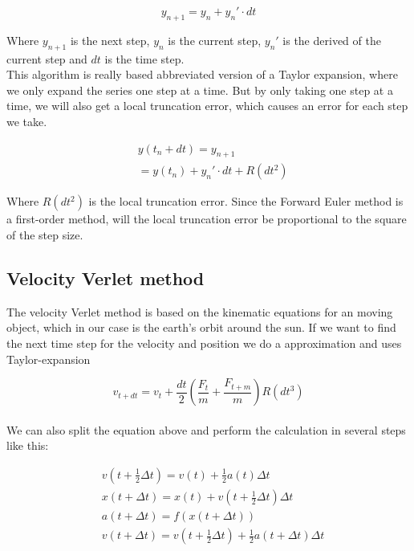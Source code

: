 \documentclass{article}
\begin{document}
\begin{multicols}{2}
\begin{equation}
y_{n+1}=y_n + y_n'\cdot dt
\label{eq:yn1}
\end{equation}

Where $y_{n+1}$ is the next step, $y_n$ is the current step, $y_n'$ is the derived of the current step and $dt$ is the time step.\\
This algorithm is really based abbreviated version of a Taylor expansion, where we only expand the series one step at a time. But by only taking one step at a time, we will also get a local truncation error, which causes an error for each step we take. 

\begin{equation}
\begin{split}
&y(t_n+dt)=y_{n+1}\\
&=y(t_n)+y_n'\cdot dt + R(dt^2)
\end{split}
\label{eq:ytndt}
\end{equation} 

Where $R(dt^2)$ is the local truncation error. Since the Forward Euler method is a first-order method, will the local truncation error be proportional to the square of the step size. 

\subsection{Velocity Verlet method}

The velocity Verlet method is based on the kinematic equations for an moving object, which in our case is the earth's orbit around the sun. If we want to find the next time step for the velocity and position we do a approximation and uses Taylor-expansion   

\begin{equation}
    v_{t+dt}=v_t +\frac{dt}{2}(\frac{F_t}{m}+\frac{F_{t+m}}{m}) R(dt^3)
\end{equation}\\

We can also split the equation above and perform the calculation in several steps like this:

\begin{equation}
\begin{split}
&v(t+\frac{1}{2}\Delta t)=v(t)+\frac{1}{2}a(t)\Delta t\\
&x(t+\Delta t)=x(t)+v(t+\frac{1}{2}\Delta t)\Delta t\\
&a(t+\Delta t)=f(x(t+\Delta t))\\
&v(t+\Delta t)=v(t+\frac{1}{2}\Delta t)+\frac{1}{2}a(t+\Delta t)\Delta t
\end{split}
\label{eq:steps}
\end{equation}
\\
\\
\\


\end{multicols}
\end{document}
